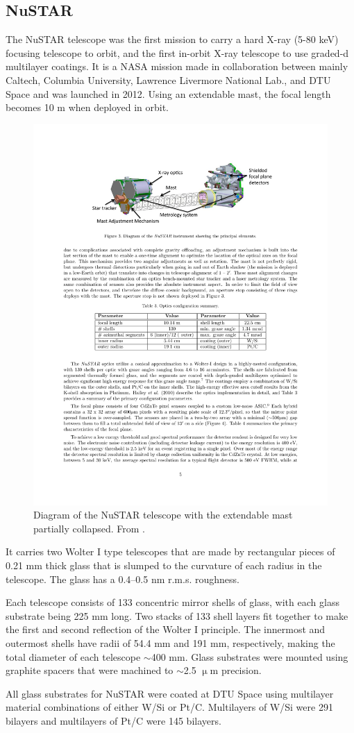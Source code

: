 \subsection{NuSTAR}\label{sec:nustar}
The NuSTAR telescope was the first mission to carry a hard X-ray (5-80 keV) focusing telescope to orbit, and the first in-orbit X-ray telescope to use graded-d multilayer coatings. It is a NASA mission made in collaboration between mainly Caltech, Columbia University, Lawrence Livermore National Lab., and DTU Space and was launched in 2012. Using an extendable mast, the focal length becomes 10 m when deployed in orbit.

\begin{figure}[!ht] %
	\centering	\includegraphics[width=0.8\linewidth]{figures/introduction/nustar.pdf}
	\caption{\footnotesize Diagram of the NuSTAR telescope with the extendable mast partially collapsed. From \cite{Harrison:2010gu}.}
	\label{fig:xrayperformance}
\end{figure}

It carries two Wolter I type telescopes that are made by rectangular pieces of 0.21 mm thick glass that is slumped to the curvature of each radius in the telescope\cite{Craig:2000fd,Hailey:1997ie}. The glass has a 0.4--0.5 nm r.m.s. roughness.

Each telescope consists of 133 concentric mirror shells of glass, with each glass substrate being 225 mm long. Two stacks of 133 shell layers fit together to make the first and second reflection of the Wolter I principle. The innermost and outermost shells have radii of 54.4 mm and 191 mm, respectively, making the total diameter of each telescope $\sim$400 mm. Glass substrates were mounted using graphite spacers that were machined to $\sim$2.5 $\upmu$m precision.

All glass substrates for NuSTAR were coated at DTU Space using multilayer material combinations of either W/Si or Pt/C. Multilayers of W/Si were 291 bilayers and multilayers of Pt/C were 145 bilayers.
